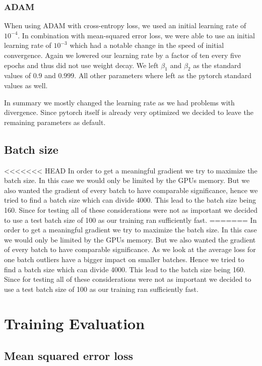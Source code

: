 \subsubsection{ADAM}
When using ADAM with cross-entropy loss, we used an initial learning rate of $10^{-4}$. In combination with mean-squared error loss, we were able to use an initial learning rate of $10^{-3}$ which had a notable change in the speed of initial convergence.
Again we lowered our learning rate by a factor of ten every five epochs and thus did not use weight decay. We left $\beta_1$ and $\beta_2$ as the standard values of $0.9$ and $0.999$. All other parameters where left as the pytorch standard values as well.

In summary we mostly changed the learning rate as we had problems with divergence. Since pytorch itself is already very optimized we decided to leave the remaining parameters as default.

\subsection{Batch size}
<<<<<<< HEAD
In order to get a meaningful gradient we try to maximize the batch size.
In this case we would only be limited by the GPUs memory.
But we also wanted the gradient of every batch to have comparable significance, hence we tried to find a batch size which can divide 4000.
This lead to the batch size being 160. Since for testing all of these considerations were not as important we decided to use a test batch size of 100 as our training ran sufficiently fast.
=======
In order to get a meaningful gradient we try to maximize the batch size. 
In this case we would only be limited by the GPUs memory. 
But we also wanted the gradient of every batch to have comparable significance. As we look at the average loss for one batch outliers have a bigger impact on smaller batches. Hence we tried to find a batch size which can divide 4000.
This lead to the batch size being 160. Since for testing all of these considerations were not as important we decided to use a test batch size of 100 as our training ran sufficiently fast.

\section{Training Evaluation}

\subsection{Mean squared error loss}

